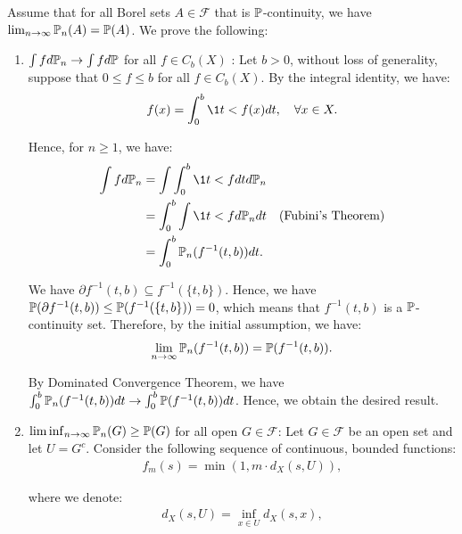 \begin{proof*}
    Assume that for all Borel sets $A\in\mathcal{F}$ that is $\mathbb{P}$-continuity, we have $\lim_{n\to\infty} \mathbb{P}_n(A) = \mathbb{P}(A)$. We prove the following: 
    \begin{enumerate}
        \item $\int fd\mathbb{P}_n \to \int fd\mathbb{P}$ for all $f\in C_b(X)$ : Let $b>0$, without loss of generality, suppose that $0\le f \le b$ for all $f\in C_b(X)$. By the integral identity, we have:
        \begin{align*}
            f(x) = \int_0^b \1{t < f(x)}dt, \quad \forall x\in X.    
        \end{align*}

        \noindent Hence, for $n\ge 1$, we have:
        \begin{align*}
            \int f d\Pm_n &= \int \int_0^b \1{t < f}dt d\Pm_n \\
                &= \int_0^b \int \1{t < f}d\Pm_n dt \quad \text{(Fubini's Theorem)} \\
                &= \int_0^b \Pm_n(f^{-1}(t, b))dt.
        \end{align*} 

        \noindent We have $\partial f^{-1}(t, b) \subseteq f^{-1}(\{t, b\})$. Hence, we have $\mathbb{P}(\partial f^{-1}(t, b)) \le \mathbb{P}(f^{-1}(\{t, b\})) = 0$, which means that $f^{-1}(t, b)$ is a $\mathbb{P}$-continuity set. Therefore, by the initial assumption, we have:
        \begin{align*}
            \lim_{n\to\infty} \mathbb{P}_n(f^{-1}(t, b)) = \mathbb{P}(f^{-1}(t, b)). 
        \end{align*} 

        \noindent By Dominated Convergence Theorem, we have $\int_0^b \mathbb{P}_n(f^{-1}(t, b))dt \to \int_0^b \mathbb{P}(f^{-1}(t, b))dt$. Hence, we obtain the desired result.

        \item $\liminf_{n\to\infty}\mathbb{P}_n(G) \ge \mathbb{P}(G)$ for all open $G\in\mathcal{F}$: Let $G\in\mathcal{F}$ be an open set and let $U=G^c$. Consider the following sequence of continuous, bounded functions:
        \begin{align*}
            f_m(s) = \min(1, m \cdot d_X(s, U)),
        \end{align*} 

        \noindent where we denote:
        \begin{align*}
            d_X(s, U) = \inf_{x\in U} d_X(s, x),
        \end{align*} 


\end{enumerate}
\end{proof*}
